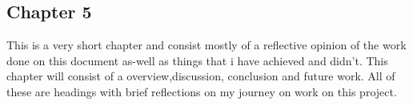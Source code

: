 \subsection{Chapter 5}
This is a very short chapter and consist mostly of a reflective opinion of the work done on this document as-well as things that i have achieved and didn't. This chapter will consist of a overview,discussion, conclusion and future work. All of these are headings with brief reflections on my journey on work on this project. 




